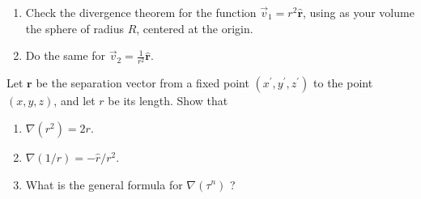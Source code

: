 

%
%

\newcommand{\hmwkTitle}{HW 02}
\newcommand{\hmwkSubTitle}{Assignment 2}
\newcommand{\hmwkDueDate}{February 13th, 2025}
\newcommand{\hmwkDueTime}{11:59 PM}
\newcommand{\hmwkClass}{PHYS 313}
\newcommand{\hmwkClassTime}{0101}
\newcommand{\hmwkClassInstructor}{Dr. Ji}
\newcommand{\hmwkAuthorName}{\textbf{Vai Srivastava}}
\newcommand{\hmwkCompletionDate}{\today}



\maketitle

\pagebreak

\begin{hwkProblem}{1.39}{}

	\begin{enumerate}
		\item Check the divergence theorem for the function \(  \vec{v}_1=r^2\mathbf{\hat{r}} \), using as your volume the sphere of radius \( R \), centered at the origin.
		\item Do the same for \( \vec{v}_2 = \frac{1}{r^2} \mathbf{\hat{r}} \).
	\end{enumerate}

	\hwkSol



\end{hwkProblem}

\begin{hwkProblem}{1.43}{}

	Let \(\boldsymbol{r}\) be the separation vector from a fixed point \(\left(x^{\prime}, y^{\prime}, z^{\prime}\right)\) to the point \((x, y, z)\), and let \(r\) be its length. Show that
	\begin{enumerate}
		\item \(\nabla\left(r^2\right)=2 r\).
		\item \(\nabla(1 / r)=-\hat{r} / r^2\).
		\item What is the general formula for \(\nabla\left(\tau^n\right)\) ?
	\end{enumerate}

	\hwkSol



\end{hwkProblem}

